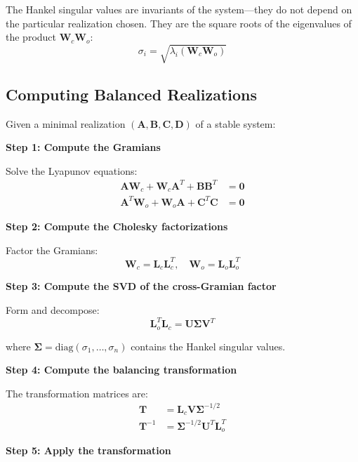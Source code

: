 The Hankel singular values are invariants of the system---they do not depend on the particular realization chosen. They are the square roots of the eigenvalues of the product $\mathbf{W}_c\mathbf{W}_o$:
\begin{equation}
\sigma_i = \sqrt{\lambda_i(\mathbf{W}_c\mathbf{W}_o)}
\end{equation}

\subsection{Computing Balanced Realizations}

Given a minimal realization $(\mathbf{A}, \mathbf{B}, \mathbf{C}, \mathbf{D})$ of a stable system:

\textbf{Step 1: Compute the Gramians}

Solve the Lyapunov equations:
\begin{align}
\mathbf{A}\mathbf{W}_c + \mathbf{W}_c\mathbf{A}^T + \mathbf{B}\mathbf{B}^T &= \mathbf{0} \\
\mathbf{A}^T\mathbf{W}_o + \mathbf{W}_o\mathbf{A} + \mathbf{C}^T\mathbf{C} &= \mathbf{0}
\end{align}

\textbf{Step 2: Compute the Cholesky factorizations}

Factor the Gramians:
\begin{equation}
\mathbf{W}_c = \mathbf{L}_c\mathbf{L}_c^T, \quad \mathbf{W}_o = \mathbf{L}_o\mathbf{L}_o^T
\end{equation}

\textbf{Step 3: Compute the SVD of the cross-Gramian factor}

Form and decompose:
\begin{equation}
\mathbf{L}_o^T\mathbf{L}_c = \mathbf{U}\boldsymbol{\Sigma}\mathbf{V}^T
\end{equation}

where $\boldsymbol{\Sigma} = \text{diag}(\sigma_1, \ldots, \sigma_n)$ contains the Hankel singular values.

\textbf{Step 4: Compute the balancing transformation}

The transformation matrices are:
\begin{align}
\mathbf{T} &= \mathbf{L}_c\mathbf{V}\boldsymbol{\Sigma}^{-1/2} \\
\mathbf{T}^{-1} &= \boldsymbol{\Sigma}^{-1/2}\mathbf{U}^T\mathbf{L}_o^T
\end{align}

\textbf{Step 5: Apply the transformation}

